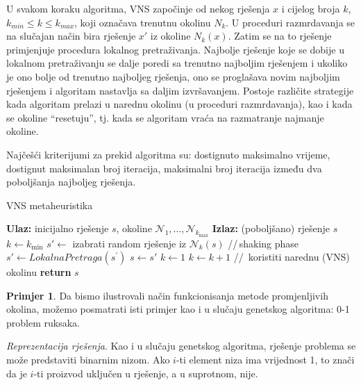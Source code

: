 \documentclass[a4paper, utf8, 11pt, colorlinks]{book}
\theoremstyle{definition}
\newtheorem{primjer}{Primjer}[chapter]
\begin{document}
U svakom koraku algoritma, VNS započinje od nekog rješenja $x$ i cijelog broja $k$, $k_{min}\leqslant k\leqslant k_{max}$, koji označava trenutnu okolinu $N_k$. U proceduri razmrdavanja
se na slučajan način bira rješenje  $x'$ iz okoline  $N_k(x)$. Zatim se na to rješenje primjenjuje procedura lokalnog pretraživanja. Najbolje rješenje koje se dobije u lokalnom pretraživanju se dalje poredi sa trenutno najboljim rješenjem i ukoliko je ono bolje od trenutno najboljeg rješenja, ono se proglašava novim najboljim rješenjem i algoritam nastavlja sa daljim izvršavanjem. Postoje različite strategije kada algoritam prelazi u narednu okolinu (u proceduri razmrdavanja), kao i kada se okoline ``resetuju'', tj. kada se algoritam vraća na razmatranje najmanje okoline. 

Najčešći kriterijumi za prekid   algoritma su: dostignuto maksimalno  vrijeme, dostignut maksimalan broj iteracija, maksimalni broj iteracija između dva poboljšanja najboljeg rješenja. %

    \begin{algorithm}[!t] 
	\caption{VNS metaheuristika}\label{alg:vns}
	\begin{algorithmic}[1]
		\STATE \textbf{Ulaz:} inicijalno rješenje $s$, okoline $\mathcal{N}_1,\ldots, \mathcal{N}_{k_{\max}}$ 
		\STATE \textbf{Izlaz:} (poboljšano) rješenje $s$
		\STATE $k \gets  k_{\min}$
		\STATE  $s' \gets$ izabrati random rješenje iz $\mathcal{N}_k(s)$ \hspace{0.3cm}//\,shaking phase 
		\STATE $s' \gets  LokalnaPretraga(s^{'})$
		\STATE $s \gets s'$
		\STATE $k \gets 1$
		\ELSE 
		\STATE $k \gets k+1$ \hspace{0.3cm}//\, koristiti narednu (VNS) okolinu
		\ENDIF
		\ENDWHILE
		\ENDWHILE
		\STATE \textbf{return} $s$
	\end{algorithmic}
\end{algorithm}


\begin{primjer} Da bismo ilustrovali način funkcionisanja metode promjenljivih okolina, možemo posmatrati isti primjer kao i u slučaju genetskog algoritma: 0-1 problem ruksaka. 
\end{primjer}

\emph{Reprezentacija rješenja}. Kao i u slučaju genetskog algoritma, rješenje problema se može predstaviti binarnim nizom. Ako $i$-ti element niza ima vrijednost 1, to znači da je $i$-ti proizvod uključen u rješenje, a u suprotnom, nije.
\end{document}
